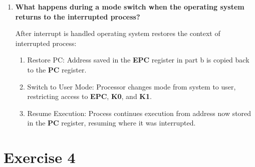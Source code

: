 \documentclass{article}
\newcommand{\exercise}[1]{
    \section*{Exercise #1}
    \markboth{Exercise #1}{}
}
\begin{document}
\begin{enumerate}[label=\textbf{\alph*})]
    \item \textbf{What happens during a mode switch when the operating system returns to the interrupted process?}

    After interrupt is handled operating system restores the context of
    interrupted process:
    \begin{enumerate}
        \item Restore PC: Address saved in the \textbf{EPC} register in part b
        is copied back to the \textbf{PC} register.
        \item Switch to User Mode: Processor changes mode from system to user, restricting access to \textbf{EPC}, \textbf{K0}, and \textbf{K1}.
        \item Resume Execution: Process continues execution from  address now stored in the \textbf{PC} register, resuming where it was interrupted.
    \end{enumerate}
\end{enumerate}

\newpage
\exercise{4}


\newpage


\end{document}
